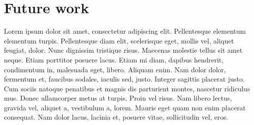 \section{Future work} \label{sec:future}
Lorem ipsum dolor sit amet, consectetur adipiscing elit. Pellentesque elementum elementum turpis. Pellentesque diam elit, scelerisque eget, mollis vel, aliquet feugiat, dolor. Nunc dignissim tristique risus. Maecenas molestie tellus sit amet neque. Etiam porttitor posuere lacus. Etiam mi diam, dapibus hendrerit, condimentum in, malesuada eget, libero. Aliquam enim. Nam dolor dolor, fermentum et, faucibus sodales, iaculis sed, justo. Integer sagittis placerat justo. Cum sociis natoque penatibus et magnis dis parturient montes, nascetur ridiculus mus. Donec ullamcorper metus at turpis. Proin vel risus. Nam libero lectus, gravida vel, aliquet a, vestibulum a, lorem. Mauris eget quam non enim placerat consequat. Nam dolor lacus, lacinia et, posuere vitae, sollicitudin vel, eros.
